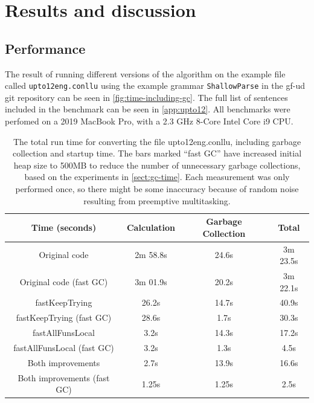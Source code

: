 \chapter{Results and discussion}

\section{Performance}



The result of running different versions of the algorithm on the example file called \texttt{upto12eng.conllu} using the example grammar \texttt{ShallowParse} in the gf-ud git repository can be seen in \autoref{fig:time-including-gc}. The full list of sentences included in the benchmark can be seen in \autoref{app:upto12}. All benchmarks were perfomed on a 2019 MacBook Pro, with a 2.3 GHz 8-Core Intel Core i9 CPU.

\begin{table}[]
    \centering
    \begin{tabular}{c|ccc}
    Time (seconds) & Calculation & Garbage Collection & Total \\
    \hline
    Original code & 2m 58.8s & 24.6s & 3m 23.5s \\
    Original code (fast GC) & 3m 01.9s & 20.2s & 3m 22.1s \\
    fastKeepTrying & 26.2s & 14.7s & 40.9s \\
    fastKeepTrying (fast GC) & 28.6s & 1.7s & 30.3s \\
    fastAllFunsLocal & 3.2s & 14.3s & 17.2s \\
    fastAllFunsLocal (fast GC) & 3.2s & 1.3s & 4.5s \\
    Both improvements & 2.7s & 13.9s & 16.6s \\
    Both improvements (fast GC) & 1.25s & 1.25s & 2.5s \\
    \end{tabular}
    \caption{The total run time for converting the file upto12eng.conllu, including garbage collection and startup time. The bars marked ``fast GC'' have increased initial heap size to 500MB to reduce the number of unnecessary garbage collections, based on the experiments in \autoref{sect:gc-time}. Each measurement was only performed once, so there might be some inaccuracy because of random noise resulting from preemptive multitasking. }
    \label{tab:time-with-gc}
\end{table}

